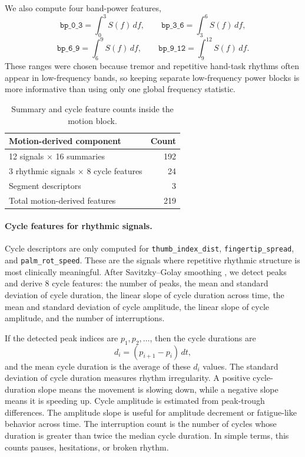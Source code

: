 \documentclass[10pt,twocolumn]{article}
\begin{document}
We also compute four band-power features,
\begin{equation}
\texttt{bp\_0\_3}=\int_{0}^{3} S(f)\,df,
\qquad
\texttt{bp\_3\_6}=\int_{3}^{6} S(f)\,df,
\end{equation}
\begin{equation}
\texttt{bp\_6\_9}=\int_{6}^{9} S(f)\,df,
\qquad
\texttt{bp\_9\_12}=\int_{9}^{12} S(f)\,df.
\end{equation}
These ranges were chosen because tremor and repetitive hand-task rhythms often appear in low-frequency bands, so keeping separate low-frequency power blocks is more informative than using only one global frequency statistic.

\begin{table}[H]
\centering
\caption{Summary and cycle feature counts inside the motion block.}
\label{tab:summary-cycle-counts}
\begin{tabular}{lr}
\toprule
Motion-derived component & Count \\
\midrule
12 signals $\times$ 16 summaries & 192 \\
3 rhythmic signals $\times$ 8 cycle features & 24 \\
Segment descriptors & 3 \\
\midrule
Total motion-derived features & 219 \\
\bottomrule
\end{tabular}
\end{table}

\paragraph{Cycle features for rhythmic signals.}
Cycle descriptors are only computed for \texttt{thumb\_index\_dist}, \texttt{fingertip\_spread}, and \texttt{palm\_rot\_speed}. These are the signals where repetitive rhythmic structure is most clinically meaningful. After Savitzky--Golay smoothing \citep{savitzky1964}, we detect peaks and derive 8 cycle features: the number of peaks, the mean and standard deviation of cycle duration, the linear slope of cycle duration across time, the mean and standard deviation of cycle amplitude, the linear slope of cycle amplitude, and the number of interruptions.

If the detected peak indices are $p_1,p_2,\dots$, then the cycle durations are
\begin{equation}
d_i=(p_{i+1}-p_i)\,dt,
\end{equation}
and the mean cycle duration is the average of these $d_i$ values. The standard deviation of cycle duration measures rhythm irregularity. A positive cycle-duration slope means the movement is slowing down, while a negative slope means it is speeding up. Cycle amplitude is estimated from peak-trough differences. The amplitude slope is useful for amplitude decrement or fatigue-like behavior across time. The interruption count is the number of cycles whose duration is greater than twice the median cycle duration. In simple terms, this counts pauses, hesitations, or broken rhythm.
\end{document}
